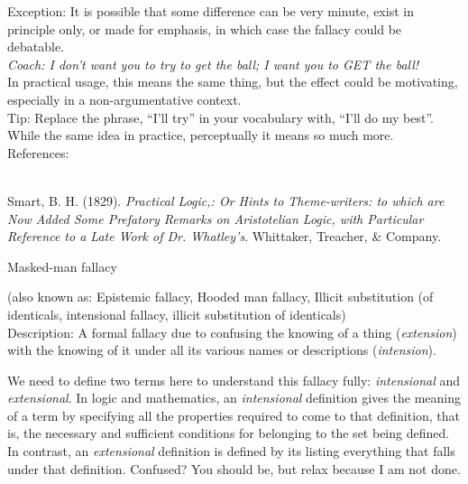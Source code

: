 \documentclass[a4paper,12pt,single,pdftex]{scrartcl}
\begin{document}
{    
      Exception: It is possible that some difference can be very minute, exist in principle only, or made for emphasis, in which case the fallacy could be debatable.
    \\

    
      {\em Coach:  I don’t want you to try to get the ball; I want you to GET the ball!}
    \\

    
      In practical usage, this means the same thing, but the effect could be motivating, especially in a non-argumentative context.
    \\

    
      Tip: Replace the phrase, “I’ll try” in your vocabulary with, “I’ll do my best”.  While the same idea in practice, perceptually it means so much more.
    \\

    References:

    
      
        
      \\

      
        
          Smart, B. H. (1829). {\it Practical Logic,: Or Hints to Theme-writers: to which are Now Added Some Prefatory Remarks on Aristotelian Logic, with Particular Reference to a Late Work of Dr. Whatley’s}. Whittaker, Treacher, \& Company.
        
      
    
  }


Masked-man fallacy
    
      (also known as: Epistemic fallacy, Hooded man fallacy, Illicit substitution (of identicals, intensional fallacy, illicit substitution of identicals)
    \\

  
    Description: A formal fallacy due to confusing the knowing of a thing ({\it extension}) with the knowing of it under all its various names or descriptions ({\it intension}).

    
      We need to define two terms here to understand this fallacy fully: {\it intensional}  and {\it extensional}.  In logic and mathematics, an {\it intensional}  definition gives the meaning of a term by specifying all the properties required to come to that definition, that is, the necessary and sufficient conditions for belonging to the set being defined.  In contrast, an {\it extensional} definition is defined by its listing everything that falls under that definition.  Confused?  You should be, but relax because I am not done.
    \\
\end{document}
